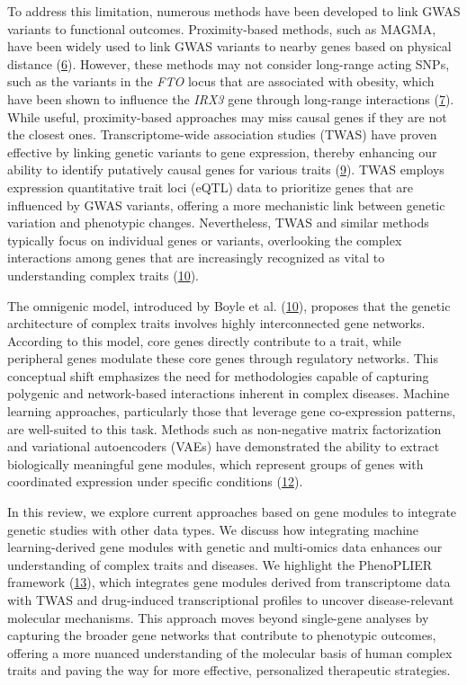 To address this limitation, numerous methods have been developed to link GWAS variants to functional outcomes.
Proximity-based methods, such as MAGMA, have been widely used to link GWAS variants to nearby genes based on physical distance (\protect\hyperlink{ref-19XiXgYmd}{6}).
However, these methods may not consider long-range acting SNPs, such as the variants in the \emph{FTO} locus that are associated with obesity, which have been shown to influence the \emph{IRX3} gene through long-range interactions (\protect\hyperlink{ref-167QL5tMV}{7}).
While useful, proximity-based approaches may miss causal genes if they are not the closest ones.
Transcriptome-wide association studies (TWAS) have proven effective by linking genetic variants to gene expression, thereby enhancing our ability to identify putatively causal genes for various traits (\protect\hyperlink{ref-l6ogswV3}{9}).
TWAS employs expression quantitative trait loci (eQTL) data to prioritize genes that are influenced by GWAS variants, offering a more mechanistic link between genetic variation and phenotypic changes.
Nevertheless, TWAS and similar methods typically focus on individual genes or variants, overlooking the complex interactions among genes that are increasingly recognized as vital to understanding complex traits (\protect\hyperlink{ref-vpIDZCSa}{10}).

The omnigenic model, introduced by Boyle et al. (\protect\hyperlink{ref-vpIDZCSa}{10}), proposes that the genetic architecture of complex traits involves highly interconnected gene networks.
According to this model, core genes directly contribute to a trait, while peripheral genes modulate these core genes through regulatory networks.
This conceptual shift emphasizes the need for methodologies capable of capturing polygenic and network-based interactions inherent in complex diseases.
Machine learning approaches, particularly those that leverage gene co-expression patterns, are well-suited to this task.
Methods such as non-negative matrix factorization and variational autoencoders (VAEs) have demonstrated the ability to extract biologically meaningful gene modules, which represent groups of genes with coordinated expression under specific conditions (\protect\hyperlink{ref-170T6ip47}{12}).

In this review, we explore current approaches based on gene modules to integrate genetic studies with other data types.
We discuss how integrating machine learning-derived gene modules with genetic and multi-omics data enhances our understanding of complex traits and diseases.
We highlight the PhenoPLIER framework (\protect\hyperlink{ref-NM3rHx1i}{13}), which integrates gene modules derived from transcriptome data with TWAS and drug-induced transcriptional profiles to uncover disease-relevant molecular mechanisms.
This approach moves beyond single-gene analyses by capturing the broader gene networks that contribute to phenotypic outcomes, offering a more nuanced understanding of the molecular basis of human complex traits and paving the way for more effective, personalized therapeutic strategies.

